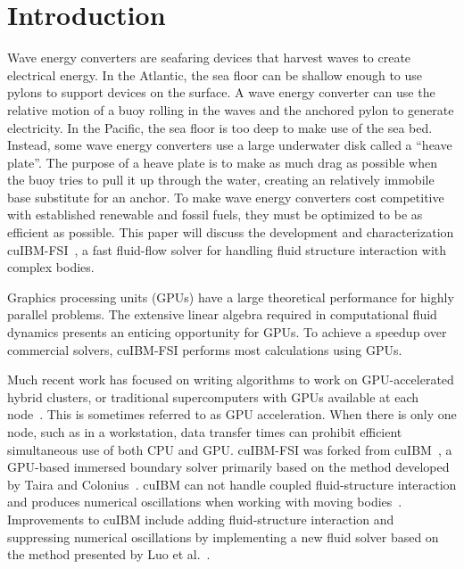 \documentclass[preprint,12pt]{elsarticle}
\begin{document}

\section{Introduction}
%
Wave energy converters are seafaring devices that harvest waves to create electrical energy.
In the Atlantic, the sea floor can be shallow enough to use pylons to support devices on the surface.
A wave energy converter can use the relative motion of a buoy rolling in the waves and the anchored pylon to generate electricity.
In the Pacific, the sea floor is too deep to make use of the sea bed.
Instead, some wave energy converters use a large underwater disk called a ``heave plate''.
The purpose of a heave plate is to make as much drag as possible when the buoy tries to pull it up through the water, creating an relatively immobile base substitute for an anchor.
To make wave energy converters cost competitive with established renewable and fossil fuels, they must be optimized to be as efficient as possible.
This paper will discuss the development and characterization cuIBM-FSI~\cite{cuIBM-FSI:v0.1}, a fast fluid-flow solver for handling fluid structure interaction with complex bodies.

Graphics processing units (GPUs) have a large theoretical performance for highly parallel problems.
The extensive linear algebra required in computational fluid dynamics presents an enticing opportunity for GPUs.
To achieve a speedup over commercial solvers, cuIBM-FSI performs most calculations using GPUs.

Much recent work has focused on writing algorithms to work on GPU-accelerated hybrid clusters, or traditional supercomputers with GPUs available at each node~\cite{xu2014collaborating,liu2016hybrid,norouzi2016new}.
This is sometimes referred to as GPU acceleration.
When there is only one node, such as in a workstation, data transfer times can prohibit efficient simultaneous use of both CPU and GPU.
cuIBM-FSI was forked from cuIBM~\cite{layton2011cuibm,Krishnan2017}, a GPU-based immersed boundary solver primarily based on the method developed by Taira and Colonius~\cite{Taira:2007jl}.
cuIBM can not handle coupled fluid-structure interaction and produces numerical oscillations when working with moving bodies~\cite{Krishnan:2012jt}.
Improvements to cuIBM include adding fluid-structure interaction and suppressing numerical oscillations by implementing a new fluid solver based on the method presented by Luo et al.~\cite{Luo:2012gx}.
\end{document}
